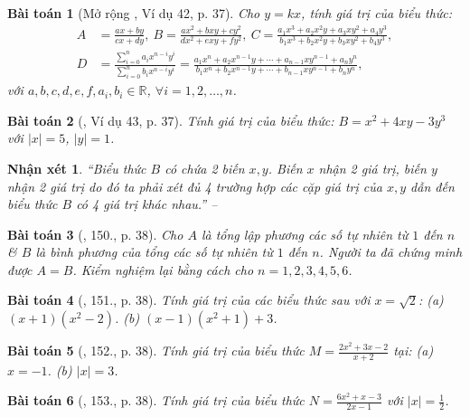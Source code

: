 \documentclass{article}
\newtheorem{baitoan}{Bài toán}
\newtheorem{nhanxet}{Nhận xét}
\begin{document}
\begin{baitoan}[Mở rộng \cite{Tuyen_Toan_7}, Ví dụ 42, p. 37]
	\label{mo rong Tuyen_Toan_7 vi du 42}
	Cho $y = kx$, tính giá trị của biểu thức:
	\begin{align*}
		A &= \frac{ax + by}{cx + dy},\ B = \frac{ax^2 + bxy + cy^2}{dx^2 + exy + fy^2},\ C = \frac{a_1x^3 + a_2x^2y + a_3xy^2 + a_4y^3}{b_1x^3 + b_2x^2y + b_3xy^2 + b_4y^3},\\
		D &= \frac{\sum_{i=0}^n a_ix^{n-i}y^i}{\sum_{i=0}^n b_ix^{n-i}y^i} = \frac{a_1x^n + a_2x^{n-1}y + \cdots + a_{n-1}xy^{n-1} + a_ny^n}{b_1x^n + b_2x^{n-1}y + \cdots + b_{n-1}xy^{n-1} + b_ny^n},
	\end{align*}
	với $a,b,c,d,e,f,a_i,b_i\in\mathbb{R}$, $\forall i = 1,2,\ldots,n$.
\end{baitoan}

\begin{baitoan}[\cite{Tuyen_Toan_7}, Ví dụ 43, p. 37]
	Tính giá trị của biểu thức: $B = x^2 + 4xy - 3y^3$ với $|x| = 5$, $|y| = 1$.
\end{baitoan}

\begin{nhanxet}
	``Biểu thức $B$ có chứa 2 biến $x,y$. Biến $x$ nhận 2 giá trị, biến $y$ nhận 2 giá trị do đó ta phải xét đủ 4 trường hợp các cặp giá trị của $x,y$ dẫn đến biểu thức $B$ có 4 giá trị khác nhau.'' -- \cite[p. 38]{Tuyen_Toan_7}
\end{nhanxet}

\begin{baitoan}[\cite{Tuyen_Toan_7}, 150., p. 38]
	Cho $A$ là tổng lập phương các số tự nhiên từ $1$ đến $n$ \& $B$ là bình phương của tổng các số tự nhiên từ $1$ đến $n$. Người ta đã chứng minh được $A = B$. Kiểm nghiệm lại bằng cách cho $n = 1,2,3,4,5,6$.
\end{baitoan}

\begin{baitoan}[\cite{Tuyen_Toan_7}, 151., p. 38]
	Tính giá trị của các biểu thức sau với $x = \sqrt{2}$: (a) $(x + 1)(x^2 - 2)$. (b) $(x - 1)(x^2 + 1) + 3$.
\end{baitoan}

\begin{baitoan}[\cite{Tuyen_Toan_7}, 152., p. 38]
	Tính giá trị của biểu thức $M = \frac{2x^2 + 3x - 2}{x + 2}$ tại: (a) $x = -1$. (b) $|x| = 3$.
\end{baitoan}

\begin{baitoan}[\cite{Tuyen_Toan_7}, 153., p. 38]
	Tính giá trị của biểu thức $N = \frac{6x^2 + x - 3}{2x - 1}$ với $|x| = \frac{1}{2}$.
\end{baitoan}
\end{document}
